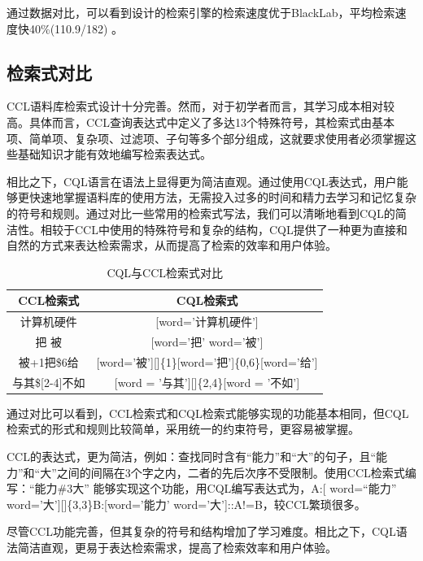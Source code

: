 \documentclass[11pt]{article}
\begin{document}
\begin{CJK*}{UTF8}{gbsn}
通过数据对比，可以看到设计的检索引擎的检索速度优于BlackLab，平均检索速度快40\%(110.9/182) 。

\subsection{检索式对比}

CCL语料库检索式设计十分完善。然而，对于初学者而言，其学习成本相对较高。具体而言，CCL查询表达式中定义了多达13个特殊符号，其检索式由基本项、简单项、复杂项、过滤项、子句等多个部分组成，这就要求使用者必须掌握这些基础知识才能有效地编写检索表达式。

相比之下，CQL语言在语法上显得更为简洁直观。通过使用CQL表达式，用户能够更快速地掌握语料库的使用方法，无需投入过多的时间和精力去学习和记忆复杂的符号和规则。通过对比一些常用的检索式写法，我们可以清晰地看到CQL的简洁性。相较于CCL中使用的特殊符号和复杂的结构，CQL提供了一种更为直接和自然的方式来表达检索需求，从而提高了检索的效率和用户体验。

\begin{table}[h]
	\begin{center}
		\begin{tabular}{c|c}
			\hline \bf CCL检索式 & \bf CQL检索式 \\ \hline
			计算机硬件 & [word='计算机硬件'] \\ \hline
			把 \textbar 被 & [word='把' \textbar word='被'] \\ \hline
			被+1把\$6给 & [word='被'][]\{1\}[word='把']\{0,6\}[word='给'] \\ \hline
			与其\$[2-4]不如 & [word = '与其'][]\{2,4\}[word = '不如'] \\ \hline
		\end{tabular}
	\end{center}
	\caption{\label{ccl-table} CQL与CCL检索式对比}
\end{table}

通过对比可以看到，CCL检索式和CQL检索式能够实现的功能基本相同，但CQL检索式的形式和规则比较简单，采用统一的约束符号，更容易被掌握。

CCL的表达式，更为简洁，例如：查找同时含有“能力”和“大”的句子，且“能力”和“大”之间的间隔在3个字之内，二者的先后次序不受限制。使用CCL检索式编写：“能力\#3大” 能够实现这个功能，用CQL编写表达式为，A:[ word=“能力” \textbar word='大'][]\{3,3\}B:[word='能力' \textbar word='大']::A!=B，较CCL繁琐很多。

尽管CCL功能完善，但其复杂的符号和结构增加了学习难度。相比之下，CQL语法简洁直观，更易于表达检索需求，提高了检索效率和用户体验。



\end{CJK*}
\end{document}
